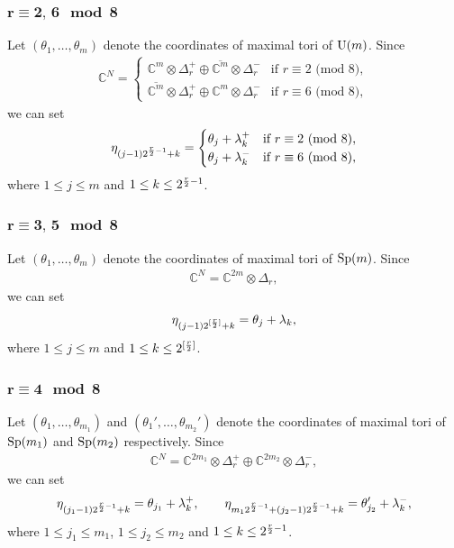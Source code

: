 \documentclass[pdftex]{sigma}
\numberwithin{equation}{section}
\begin{document}
\subsubsection[$r\equiv 2,\,6 \mod 8$]{$\boldsymbol{r\equiv 2,\,6 \mod 8}$}
Let $(\theta_1,\dots,\theta_m)$ denote the coordinates of maximal tori of ${\rm U}(m)$. Since
\begin{gather*}\mathbb{C}^N=
\begin{cases}
\mathbb{C}^{m}\otimes \Delta_r^+\oplus \overline{\mathbb{C}^{m}}\otimes \Delta_r^- & \text{if $r\equiv 2$ (mod 8)},\\
\overline{\mathbb{C}^{m}}\otimes \Delta_r^+\oplus \mathbb{C}^{m}\otimes \Delta_r^- & \text{if $r\equiv 6$ (mod 8)},
\end{cases}\end{gather*}
we can set
\begin{gather}
 \eta_{(j-1)2^{{r\over 2}-1}+k}=
 \begin{cases}
 \theta_j + \lambda_k^+ & \text{if $r\equiv 2$ (mod 8)},\\
 \theta_j + \lambda_k^- & \text{if $r\equiv 6$ (mod 8)},
 \end{cases}\label{eq: pesos r=2,6}
\end{gather}
where $1\leq j\leq m$ and $1\leq k \leq 2^{{r\over 2}-1}$.

\subsubsection[$r\equiv 3,\,5 \mod 8$]{$\boldsymbol{r\equiv 3,\,5 \mod 8}$}
Let $(\theta_1,\dots,\theta_m)$ denote the coordinates of maximal tori of ${\rm Sp}(m)$. Since
\begin{gather*}\mathbb{C}^N=\mathbb{C}^{2m}\otimes \Delta_r,\end{gather*}
we can set
\begin{gather}
 \eta_{(j-1)2^{[{r\over 2}]}+k}= \theta_j + \lambda_k , \label{eq: pesos r=3,5}
\end{gather}
where $1\leq j\leq m$ and $1\leq k \leq 2^{[{r\over 2}]}$.

\subsubsection[$r\equiv 4 \mod 8$]{$\boldsymbol{r\equiv 4 \mod 8}$}
Let $(\theta_1,\dots,\theta_{m_1})$ and $(\theta_1',\dots,\theta_{m_2}')$ denote the coordinates of maximal tori of ${\rm Sp}(m_1)$ and ${\rm Sp}(m_2)$ respectively. Since
\begin{gather*}\mathbb{C}^N=\mathbb{C}^{2m_1}\otimes \Delta_r^+\oplus\mathbb{C}^{2m_2}\otimes \Delta_r^-,\end{gather*}
we can set
\begin{gather}
 \eta_{(j_1-1)2^{{r\over 2}-1}+k}= \theta_{j_1} + \lambda_k^+, \qquad
 \eta_{m_12^{{r\over 2}-1}+(j_2-1)2^{{r\over 2}-1}+k}= \theta_{j_2}' + \lambda_k^- , \label{eq: pesos r=4}
\end{gather}
where $1\leq j_1\leq m_1$, $1\leq j_2\leq m_2$ and $1\leq k \leq 2^{{r\over 2}-1}$.
\end{document}
